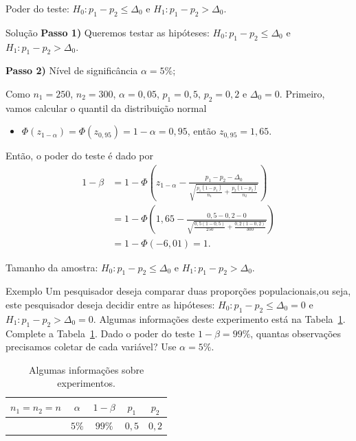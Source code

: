 \documentclass[9pt]{beamer}
\begin{document}
\begin{frame}{Poder do teste: $H_0:p_1 - p_2 \leq \Delta_0$ e $H_1: p_1 - p_2 > \Delta_0$.}

\begin{block}{Solução}
	\textbf{Passo 1)} Queremos testar as hipóteses: $H_0: p_1 - p_2 \leq \Delta_0$ e $H_1: p_1 - p_2 > \Delta_0$.
	
	\textbf{Passo 2)} Nível de significância $\alpha=5\%$;
	
	Como $n_1=250$, $n_2 = 300$, $\alpha = 0,05$, $p_1 = 0,5$, $p_2 =0,2$ e $\Delta_0=0$. Primeiro, vamos calcular o quantil da distribuição normal
	\begin{itemize}
		\item $\Phi\left( z_{1-\alpha}  \right) = \Phi\left( z_{0,95}  \right) = 1- \alpha = 0,95$, então $z_{0,95}  = 1,65$.
	\end{itemize} 

	Então, o poder do teste é dado por
	\begin{align*}
		1 - \beta &= 1 - \Phi \left( z_{1-\alpha} - \frac{p_1 - p_2 - \Delta_0}{\sqrt{\frac{p_1(1 - p_1)}{n_1} + \frac{p_2(1 - p_2)}{n_2}}} \right) \\
		&= 1 - \Phi \left( 1,65 - \frac{0,5 - 0,2 - 0}{\sqrt{\frac{0,5(1 - 0,5)}{250} + \frac{0,2(1 - 0,2)}{300}}} \right) \\ 
		&=1 - \Phi(-6,01) = 1.
	\end{align*}
\end{block}

\end{frame}

\begin{frame}{Tamanho da amostra: $H_0:p_1 - p_2 \leq \Delta_0$ e $H_1: p_1 - p_2 > \Delta_0$.}

\begin{block}{Exemplo}
	Um pesquisador deseja comparar duas proporções populacionais,ou seja, este pesquisador deseja decidir entre as hipóteses: $H_0: p_1 - p_2 \leq \Delta_0 =0$ e $H_1: p_1 - p_2 > \Delta_0 =0$. Algumas informações deste experimento está na Tabela~\ref{tab:h1-less-2-proportion-sample-size}. Complete a Tabela~\ref{tab:h1-less-2-proportion-sample-size}. Dado o poder do teste $1-\beta=99\%$, quantas observações precisamos coletar de cada variável? Use $\alpha=5\%$. 
	\begin{table}[htbp]
		\centering
		\begin{tabular}{c|c|c|c|c}
			\toprule[0.05cm]
			$n_1=n_2=n$ & $\alpha$ & $1-\beta$ & $p_1$ & $p_2$ \\ \midrule
			 & $5\%$ & $99\%$ & $0,5$  & $0,2$ \\ \bottomrule[0.05cm]
		\end{tabular}
		\caption{Algumas informações sobre experimentos.}
		\label{tab:h1-less-2-proportion-sample-size}
	\end{table}
\end{block}

\end{frame}
\end{document}
